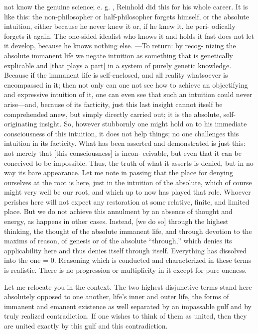 not know the genuine science; e.
g.
, Reinhold did this for his whole career.
 It
is like this: the non-philosopher or half-philosopher forgets himself, or the
absolute intuition, either because he never knew it or, if he knew it, he peri-
odically forgets it again.
 The one-sided idealist who knows it and holds it fast
does not let it develop, because he knows nothing else.
—To return: by recog-
nizing the absolute immanent life we negate intuition as something that is
genetically explicable and [that plays a part] in a system of purely genetic
knowledge.
Because if the immanent life is self-enclosed, and all
reality whatsoever is encompassed in it; then not only can one not see how to
achieve an objectifying and expressive intuition of it, one can even see that
such an intuition could never arise—and, because of its facticity, just this last
insight cannot itself be comprehended anew, but simply directly carried out; it
is the absolute, self-originating insight.
 So, however stubbornly one might
hold on to his immediate consciousness of this intuition, it does not help
things; no one challenges this intuition in its facticity.
 What has been asserted
and demonstrated is just this: not merely that [this consciousness] is incon-
ceivable, but even that it can be conceived to be impossible.
Thus, the truth of what it asserts is denied,
but in no way its bare appearance.
Let me note in passing that the place
for denying ourselves at the root is here,
just in the intuition of the absolute,
which of course might very well be our root,
and which up to now has played that role.
Whoever perishes here will not expect
any restoration at some relative, finite, and limited place.
But we do not achieve this annulment
by an absence of thought and energy,
as happens in other cases.
Instead, [we do so] through the highest thinking,
the thought of the absolute immanent life,
and through devotion to the maxims of reason,
of genesis or of the absolute “through,”
which denies its applicability here
and thus denies itself through itself.
Everything has dissolved into the one = 0.
Reasoning which is conducted and characterized
in these terms is realistic.
There is no progression or multiplicity
in it except for pure oneness.

Let me relocate you in the context.
The two highest disjunctive terms stand
here absolutely opposed to one another,
life’s inner and outer life,
the forms of immanent and emanent existence as well
separated by an impassable gulf
and by truly realized contradiction.
If one wishes to think of them as united,
then they are united exactly by this gulf and this contradiction.

